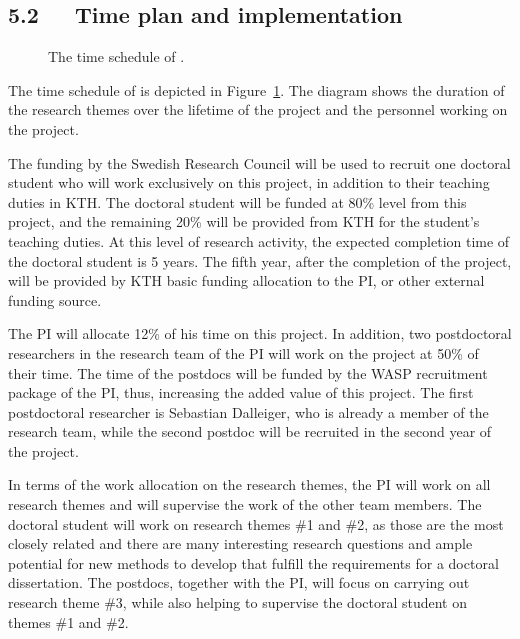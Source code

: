 \documentclass[a4paper,11pt]{article}
\begin{document}
\subsection*{5.2~~~Time plan and implementation}


\begin{figure}[t]
\begin{center}
\vspace{-2mm}
{\small}
\end{center}
\vspace{-6mm}
\caption{\label{figure:gantt}The time schedule of {\acronym}.}
\vspace{-2mm}
\end{figure}

The time schedule of \acronym is depicted in Figure~\ref{figure:gantt}. 
The diagram shows the duration of the research themes over the lifetime of the project
and the personnel working on the project.

The funding by the Swedish Research Council will be used to recruit 
one doctoral student who will work exclusively on this project, 
in addition to their teaching duties in KTH.
The doctoral student will be funded at 80\% level from this project, 
and the remaining 20\% will be provided from KTH for the student's teaching duties. 
At this level of research activity, the expected completion time of the doctoral student is 5 years. 
The fifth year, after the completion of the project, 
will be provided by KTH basic funding allocation to the PI, or other external funding source. 

The PI will allocate 12\% of his time on this project.
In addition, two postdoctoral researchers in the research team of the PI
will work on the project at 50\% of their time. 
The time of the postdocs will be funded by the WASP recruitment package of the PI, 
thus, increasing the added value of this project.
The first postdoctoral researcher is Sebastian Dalleiger, 
who is already a member of the research team, 
while the second postdoc will be recruited in the second year of the project.

In terms of the work allocation on the research themes, 
the PI will work on all research themes and will supervise the work of the other team members. 
The doctoral student will work on research themes \#1 and \#2, 
as those are the most closely related and there are many interesting research questions
and ample potential for new methods to develop that fulfill the requirements for a doctoral dissertation. 
The postdocs, together with the PI, will focus on carrying out research theme \#3,
while also helping to supervise the doctoral student on themes \#1 and \#2.
\end{document}
